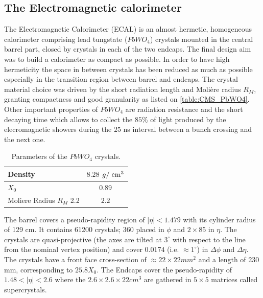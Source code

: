 \clearpage

\subsection{The Electromagnetic calorimeter}

The Electromagnetic Calorimeter (ECAL) is an almost hermetic, homogeneous calorimeter comprising lead tungstate ($PbWO_{4}$) crystals mounted in the central barrel part, closed by crystals in each of the two endcaps. The final design aim was to build a calorimeter as compact as possible. In order to have high hermeticity the space in between crystals has been reduced as much as possible especially in the transition region between barrel and endcaps. 
The crystal material choice was driven by the short radiation length and Molière radius $R_{M}$, granting compactness and good granularity as listed on \autoref{table:CMS_PbWO4}. Other important properties of  $PbWO_{4}$ are radiation resistance and the short decaying time which allows to collect the $85\%$ of light produced by the elecromagnetic showers during the $25$ ns interval between a bunch crossing and the next one.

\begin{table}[tbh!]
	\begin{center}
		
		\begin{tabular}{ | l | c |}
			\hline
			Density  & $ 8.28$ $g/\;\text{cm}^{3}$ \\ \hline
			$X_{0}$   & $0.89$ \cm \\ \hline
			Moliere Radius $R_{M}$ 2.2 & $2.2$ \cm  \\ \hline
		\end{tabular}
		\caption{Parameters of the $PbWO_{4}$ crystals.}
		\label{table:CMS_PbWO4}
	\end{center}
\end{table}

The barrel covers a pseudo-rapidity region of $|\eta| < 1.479$ with its cylinder radius of 129 cm. It contains 61200 crystals; 360 placed in $\phi$ and $2\times85$ in $\eta$. The crystals are quasi-projective (the axes are tilted at $3^{\circ}$ with respect to the line from the nominal vertex position) and cover $0.0174$ (i.e. $\approx1^{\circ}$) in $\Delta\phi$ and $\Delta\eta$. The crystals have a front face cross-section of $\approx 22\times22 mm^{2}$ and a length of 230 mm, corresponding to $25.8 X_{0}$. The Endcaps cover the pseudo-rapidity of $1.48 < |\eta| < 2.6$ where the $2.6\times2.6\times22 cm^{3}$ are gathered in $5\times5$ matrices called supercrystals.

